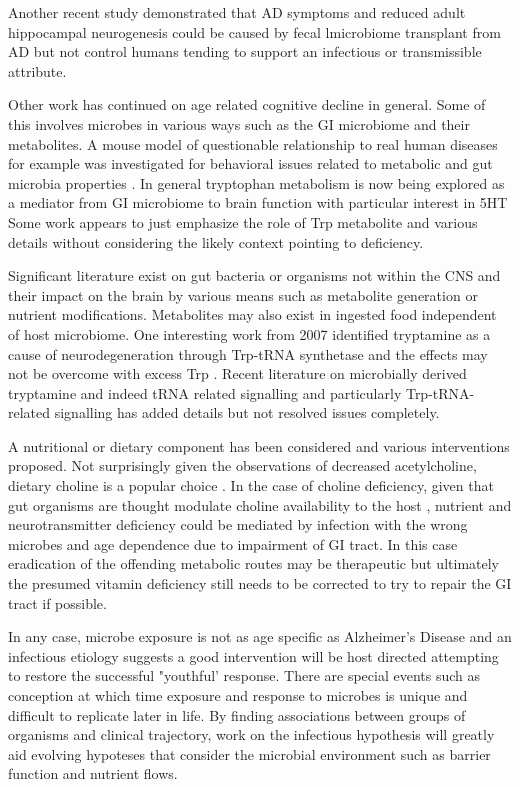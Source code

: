 \documentclass[aps,secnumarabic,balancelastpage,amsmath,amssymb,nofootinbib]{revtex4}
\begin{document}
Another recent study demonstrated that AD symptoms and reduced
adult hippocampal neurogenesis could be caused by
fecal lmicrobiome transplant from AD but not control humans
\cite{10.1093/brain/awad303} tending to support
an infectious or transmissible attribute. 


Other work has continued on age related cognitive decline in general.
Some of this involves microbes in various ways such as the
GI microbiome and their metabolites.  A mouse model of
questionable relationship to real human diseases for example
was investigated for behavioral issues related to metabolic
and gut microbia properties \cite{PMID37717663}.
In general tryptophan metabolism is now being explored as
a mediator from GI microbiome to brain function
\cite{PMC7231603} with particular interest in 5HT
\cite{PMID25078296}
Some work appears to just emphasize the role of Trp
metabolite and various details
\cite{Savonije_Weaver_Role_Tryptophan_2023}
without considering the likely context pointing to deficiency.

Significant literature exist on gut bacteria or organisms
not within the CNS and their impact on the brain by various
means such as metabolite generation or nutrient modifications.
Metabolites may also exist in ingested food independent of host
microbiome. One interesting work from 2007 identified tryptamine
as a cause of neurodegeneration through Trp-tRNA synthetase 
and the effects may not be overcome with excess Trp
\cite{PMID17114825}. Recent literature on microbially derived
tryptamine and indeed tRNA related signalling and 
particularly Trp-tRNA- related signalling has added details but not
resolved issues completely. 

A nutritional or dietary component has been considered and various
interventions proposed.
Not surprisingly given the observations of decreased
acetylcholine, dietary choline is a popular choice
\cite{PMC7041773}. 
In the case of choline deficiency, given that gut organisms
are thought modulate choline availability to the host
\cite{MartinJBlaser_Intestinal_Microbiota_Composition_Modulates_2015}
, nutrient and neurotransmitter deficiency could be mediated by
infection with the wrong microbes and age dependence due
to impairment of GI tract. In this case eradication of the
offending metabolic routes may be therapeutic but ultimately
the presumed vitamin deficiency still needs to be corrected
to try to repair the GI tract if possible.  



In any case, microbe exposure is not as  age specific
as Alzheimer's Disease and an infectious etiology 
 suggests a good intervention
will be host directed attempting to restore the successful
"youthful' response. 
There are special events such as conception at which
time exposure and response to microbes is unique and difficult
to replicate later in life.
By finding  associations between groups of organisms
and clinical trajectory, work on the infectious hypothesis
will greatly aid evolving hypoteses that consider the
microbial environment such as barrier function and nutrient flows. 
\end{document}
